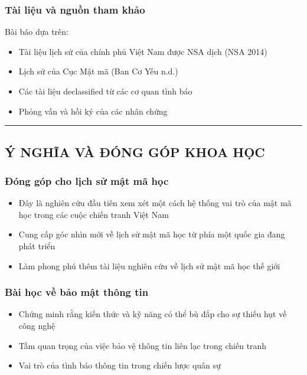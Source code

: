 \subsubsection{Tài liệu và nguồn tham khảo}

Bài báo dựa trên:
\begin{itemize}
\item Tài liệu lịch sử của chính phủ Việt Nam được NSA dịch (NSA 2014)
\item Lịch sử của Cục Mật mã (Ban Cơ Yếu n.d.)
\item Các tài liệu declassified từ các cơ quan tình báo
\item Phỏng vấn và hồi ký của các nhân chứng
\end{itemize}

\vspace{0.5cm}
\rule{\textwidth}{1pt}
\vspace{0.5cm}

\subsection{Ý NGHĨA VÀ ĐÓNG GÓP KHOA HỌC}

\subsubsection{Đóng góp cho lịch sử mật mã học}
\begin{itemize}
\item Đây là nghiên cứu đầu tiên xem xét một cách hệ thống vai trò của mật mã học trong các cuộc chiến tranh Việt Nam
\item Cung cấp góc nhìn mới về lịch sử mật mã học từ phía một quốc gia đang phát triển
\item Làm phong phú thêm tài liệu nghiên cứu về lịch sử mật mã học thế giới
\end{itemize}

\subsubsection{Bài học về bảo mật thông tin}
\begin{itemize}
\item Chứng minh rằng kiến thức và kỹ năng có thể bù đắp cho sự thiếu hụt về công nghệ
\item Tầm quan trọng của việc bảo vệ thông tin liên lạc trong chiến tranh
\item Vai trò của tình báo thông tin trong chiến lược quân sự
\end{itemize}

